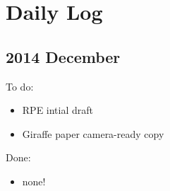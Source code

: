 \chapter{Daily Log}

\section{2014 December}

To do:
\begin{itemize}
\item RPE intial draft
\item Giraffe paper camera-ready copy
\end{itemize}

Done:
\begin{itemize}
\item none!
\end{itemize}


